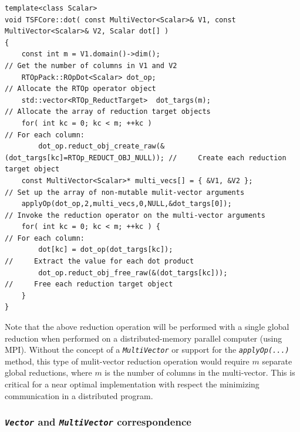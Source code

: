 {\tiny\begin{verbatim}
template<class Scalar>
void TSFCore::dot( const MultiVector<Scalar>& V1, const MultiVector<Scalar>& V2, Scalar dot[] )
{
    const int m = V1.domain()->dim();                                        // Get the number of columns in V1 and V2
    RTOpPack::ROpDot<Scalar> dot_op;                                         // Allocate the RTOp operator object
    std::vector<RTOp_ReductTarget>  dot_targs(m);                            // Allocate the array of reduction target objects
    for( int kc = 0; kc < m; ++kc )                                          // For each column:
        dot_op.reduct_obj_create_raw(&(dot_targs[kc]=RTOp_REDUCT_OBJ_NULL)); //     Create each reduction target object
    const MultiVector<Scalar>* multi_vecs[] = { &V1, &V2 };                  // Set up the array of non-mutable mulit-vector arguments
    applyOp(dot_op,2,multi_vecs,0,NULL,&dot_targs[0]);                       // Invoke the reduction operator on the multi-vector arguments
    for( int kc = 0; kc < m; ++kc ) {                                        // For each column:
        dot[kc] = dot_op(dot_targs[kc]);                                     //     Extract the value for each dot product
        dot_op.reduct_obj_free_raw(&(dot_targs[kc]));                        //     Free each reduction target object
    }
}
\end{verbatim}}

Note that the above reduction operation will be performed with a
single global reduction when performed on a distributed-memory
parallel computer (using MPI).  Without the concept of a
\texttt{\textit{Multi\-Vector}} or support for the
\texttt{\textit{applyOp(\-...)}} method, this type of mulit-vector
reduction operation would require $m$ separate global reductions,
where $m$ is the number of columns in the multi-vector.  This is
critical for a near optimal implementation with respect the
minimizing communication in a distributed program.

%
\subsubsection{\texttt{\textit{Vector}} and \texttt{\textit{Multi\-Vector}} correspondence}
\label{tsfcore:sec:vector_vs_multivector}
%

